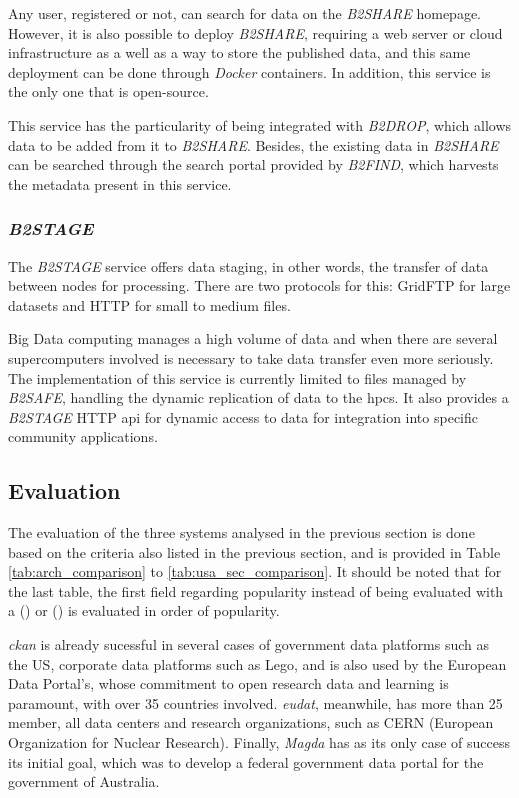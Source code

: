 Any user, registered or not, can search for data on the \textit{B2SHARE} homepage. However, it is also possible to deploy \textit{B2SHARE}, requiring a web server or cloud infrastructure as a well as a way to store the published data, and this same deployment can be done through \textit{Docker} containers. In addition, this service is the only one that is open-source.
  
This service has the particularity of being integrated with \textit{B2DROP}, which allows data to be added from it to \textit{B2SHARE}. Besides, the existing data in \textit{B2SHARE} can be searched through the search portal provided by \textit{B2FIND}, which harvests the metadata present in this service.
    
\subsubsection{\textit{B2STAGE}}
  
The \textit{B2STAGE} service offers data staging, in other words, the transfer of data between nodes for processing. There are two protocols for this: GridFTP for large datasets and HTTP for small to medium files.
  
Big Data computing manages a high volume of data and when there are several supercomputers involved is necessary to take data transfer even more seriously. The implementation of this service is currently limited to files managed by \textit{B2SAFE}, handling the dynamic replication of data to the \gls{hpc}s. It also provides a \textit{B2STAGE} HTTP \gls{api} for dynamic access to data for integration into specific community applications.
  
\subsection{Evaluation}
  
The evaluation of the three systems analysed in the previous section is done based on the criteria also listed in the previous section, and is provided in Table \ref{tab:arch_comparison} to \ref{tab:usa_sec_comparison}. It should be noted that for the last table, the first field regarding popularity instead of being evaluated with a (\checkmark) or (\xmark)  is evaluated in order of popularity. 
  
\textit{\gls{ckan}} is already sucessful in several cases of government data platforms such as the US, corporate data platforms such as Lego, and is also used by the European Data Portal's, whose commitment to open research data and learning is paramount, with over 35 countries involved. \textit{\gls{eudat}}, meanwhile, has more than 25 member, all data centers and research organizations, such as CERN (European Organization for Nuclear Research). Finally, \textit{Magda} has as its only case of success its initial goal, which was to develop a federal government data portal for the government of Australia.
  
